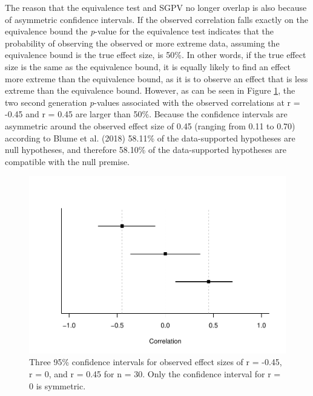 \documentclass[floatsintext,man]{apa6}
\theoremstyle{definition}
\theoremstyle{definition}
\theoremstyle{definition}
\theoremstyle{remark}
\begin{document}
The reason that the equivalence test and SGPV no longer overlap is also
because of asymmetric confidence intervals. If the observed correlation
falls exactly on the equivalence bound the \emph{p}-value for the
equivalence test indicates that the probability of observing the
observed or more extreme data, assuming the equivalence bound is the
true effect size, is 50\%. In other words, if the true effect size is
the same as the equivalence bound, it is equally likely to find an
effect more extreme than the equivalence bound, as it is to observe an
effect that is less extreme than the equivalence bound. However, as can
be seen in Figure \ref{fig:TOSTSGPV12}, the two second generation
\emph{p}-values associated with the observed correlations at r = -0.45
and r = 0.45 are larger than 50\%. Because the confidence intervals are
asymmetric around the observed effect size of 0.45 (ranging from 0.11 to
0.70) according to Blume et al. (2018) 58.11\% of the data-supported
hypotheses are null hypotheses, and therefore 58.10\% of the
data-supported hypotheses are compatible with the null premise.

\begin{figure}
\centering
\includegraphics{manuscript_files/figure-latex/TOSTSGPV12-1.pdf}
\caption{\label{fig:TOSTSGPV12}Three 95\% confidence intervals for observed
effect sizes of r = -0.45, r = 0, and r = 0.45 for n = 30. Only the
confidence interval for r = 0 is symmetric.}
\end{figure}
\end{document}
